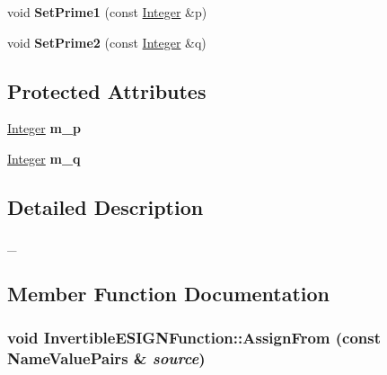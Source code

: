 \begin{DoxyCompactItemize}
\item 
\hypertarget{class_invertible_e_s_i_g_n_function_afa61426f08249432a67744162aaa90a7}{
void {\bfseries SetPrime1} (const \hyperlink{class_integer}{Integer} \&p)}
\label{class_invertible_e_s_i_g_n_function_afa61426f08249432a67744162aaa90a7}

\item 
\hypertarget{class_invertible_e_s_i_g_n_function_acf24009df2af2877cf2255ac996ef983}{
void {\bfseries SetPrime2} (const \hyperlink{class_integer}{Integer} \&q)}
\label{class_invertible_e_s_i_g_n_function_acf24009df2af2877cf2255ac996ef983}

\end{DoxyCompactItemize}
\subsection*{Protected Attributes}
\begin{DoxyCompactItemize}
\item 
\hypertarget{class_invertible_e_s_i_g_n_function_ad743ae7fe10fbff6c9dddd88e76fc7fd}{
\hyperlink{class_integer}{Integer} {\bfseries m\_\-p}}
\label{class_invertible_e_s_i_g_n_function_ad743ae7fe10fbff6c9dddd88e76fc7fd}

\item 
\hypertarget{class_invertible_e_s_i_g_n_function_adc2b3dc52e2421e408f0e1bb607da135}{
\hyperlink{class_integer}{Integer} {\bfseries m\_\-q}}
\label{class_invertible_e_s_i_g_n_function_adc2b3dc52e2421e408f0e1bb607da135}

\end{DoxyCompactItemize}


\subsection{Detailed Description}
\_\- 

\subsection{Member Function Documentation}
\hypertarget{class_invertible_e_s_i_g_n_function_aca870e350b30d04a47d452f21e903278}{
\subsubsection[{AssignFrom}]{\setlength{\rightskip}{0pt plus 5cm}void InvertibleESIGNFunction::AssignFrom (const {\bf NameValuePairs} \& {\em source})}}
\label{class_invertible_e_s_i_g_n_function_aca870e350b30d04a47d452f21e903278}


